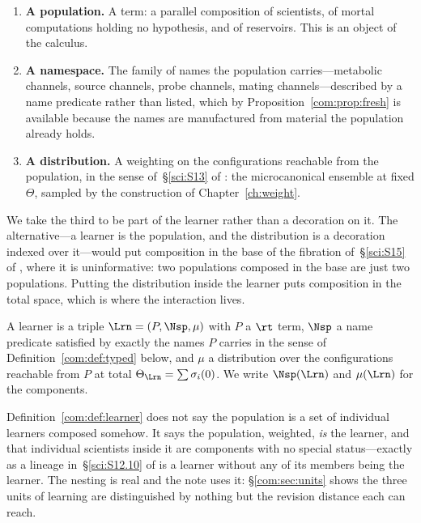 \begin{enumerate}[label=(\roman*)]
\item \textbf{A population.} A term: a parallel composition of scientists, of mortal
computations holding no hypothesis, and of reservoirs. This is an object of the calculus.
\item \textbf{A namespace.} The family of names the population carries---metabolic channels,
source channels, probe channels, mating channels---described by a name predicate rather than
listed, which by Proposition~\ref{com:prop:fresh} is available because the names are manufactured
from material the population already holds.
\item \textbf{A distribution.} A weighting on the configurations reachable from the population,
in the sense of~\S\ref{sci:S13} of \chSci: the microcanonical ensemble at fixed $\Theta$, sampled by
the construction of Chapter~\ref{ch:weight}.
\end{enumerate}

We take the third to be part of the learner rather than a decoration on it. The alternative---a
learner is the population, and the distribution is a decoration indexed over it---would put
composition in the base of the fibration of~\S\ref{sci:S15} of \chSci, where it is uninformative:
two populations composed in the base are just two populations. Putting the distribution inside
the learner puts composition in the total space, which is where the interaction lives.

\begin{definition}[Learner]\label{com:def:learner}
A learner is a triple $\Lrn = (P, \Nsp, \mu)$ with $P$ a $\rt$ term, $\Nsp$ a name predicate
satisfied by exactly the names $P$ carries in the sense of Definition~\ref{com:def:typed} below, and
$\mu$ a distribution over the configurations reachable from $P$ at total $\Theta_{\Lrn} =
\sum \sigma_i(0)$. We write $\Nsp(\Lrn)$ and $\mu(\Lrn)$ for the components.
\end{definition}

\begin{remark}\label{com:population-bag-learners}
Definition~\ref{com:def:learner} does not say the population is a set of individual learners composed
somehow. It says the population, weighted, \emph{is} the learner, and that individual scientists
inside it are components with no special status---exactly as a lineage in~\S\ref{sci:S12.10} of \chSci
is a learner without any of its members being the learner. The nesting is real and the note uses
it: \S\ref{com:sec:units} shows the three units of learning are distinguished by nothing but the
revision distance each can reach.
\end{remark}

